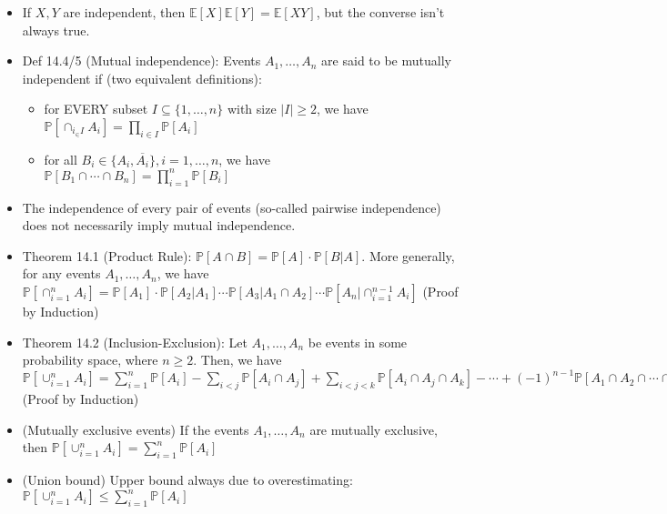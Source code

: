 \documentclass{article}
\begin{document}
\begin{itemize}
	\item If $X,Y$ are independent, then $\mathbb{E}[X]\mathbb{E}[Y] = \mathbb{E}[XY]$, but the converse isn't always true.
	\item Def 14.4/5 (Mutual independence): Events $A_1,\dots,A_n$ are said to be mutually independent if (two equivalent definitions):
	\begin{itemize}
		\item for {\color{red} EVERY} subset $I\subseteq \{1,\dots,n\}$ with size $|I|\geq2$, we have $\mathbb{P}[\cap_{i_\in I} A_i] = \prod\limits_{i\in I} \mathbb{P}[A_i]$
		\item for all $B_i\in\{A_i, \overline{A_i}\}, i=1,\dots,n$, we have $\mathbb{P}[B_1\cap\cdots\cap B_n] = \prod\limits_{i=1}^n \mathbb{P}[B_i]$
	\end{itemize}
	\item The independence of every pair of events (so-called pairwise independence) does not necessarily imply mutual independence.
	\item Theorem 14.1 (Product Rule): $\mathbb{P}[A\cap B] = \mathbb{P}[A]\cdot\mathbb{P}[B|A]$. More generally, for any events $A_1,\dots, A_n$, we have
	$\mathbb{P}[\cap_{i=1}^n A_i] = \mathbb{P}[A_1]\cdot\mathbb{P}[A_2|A_1]\cdots\mathbb{P}[A_3|A_1\cap A_2]\cdots\mathbb{P}[A_n|\cap_{i=1}^{n-1} A_i]$ (Proof by Induction)
	\item Theorem 14.2 (Inclusion-Exclusion): Let $A_1,\dots,A_n$ be events in some probability space, where $n\geq2$. Then, we have $\mathbb{P}[\cup_{i=1}^n A_i] = \sum\limits_{i=1}^n \mathbb{P}[A_i] - \sum\limits_{i<j}\mathbb{P}[A_i\cap A_j] + \sum\limits_{i<j<k} \mathbb{P}[A_i\cap A_j\cap A_k] -\cdots +(-1)^{n-1}\mathbb{P}[A_1\cap A_2\cap\cdots\cap A_n]$ (Proof by Induction)
	\item (Mutually exclusive events) If the events $A_1,\dots,A_n$ are mutually exclusive, then $\mathbb{P}[\cup_{i=1}^n A_i] = \sum\limits_{i=1}^{n} \mathbb{P}[A_i]$
	\item (Union bound) Upper bound always due to overestimating: $\mathbb{P}[\cup_{i=1}^n A_i] \leq \sum\limits_{i=1}^{n} \mathbb{P}[A_i]$
\end{itemize}
\end{document}

